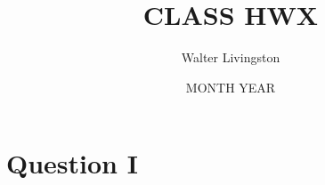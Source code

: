 \documentclass{article}
\title{CLASS HWX}
\author{Walter Livingston}
\date{MONTH YEAR}
\begin{document}
\maketitle

\section*{Question I}
\end{document}
